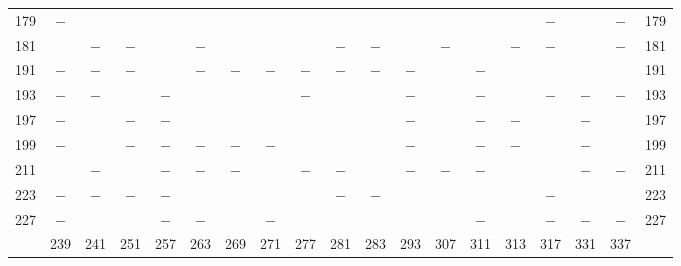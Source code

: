 \begin{center}
\begin{tabular}{r|c|c|c|c|c|c|c|c|c|c|c|c|c|c|c|c|c|r}
179 & $-$ &  &  &  &  &  &  &  &  &  &  &  &  &  & $-$ &  & $-$ & 179\\
181 &  & $-$ & $-$ &  & $-$ &  &  &  & $-$ & $-$ &  & $-$ &  & $-$ & $-$ &  & $-$ & 181\\
191 & $-$ & $-$ & $-$ &  & $-$ & $-$ & $-$ & $-$ & $-$ & $-$ & $-$ &  & $-$ &  &  &  &  & 191\\
193 & $-$ & $-$ &  & $-$ &  &  &  & $-$ &  &  & $-$ &  & $-$ &  & $-$ & $-$ & $-$ & 193\\
197 & $-$ &  & $-$ & $-$ &  &  &  &  &  &  & $-$ &  & $-$ & $-$ &  & $-$ &  & 197\\
199 & $-$ &  & $-$ & $-$ & $-$ & $-$ & $-$ &  &  &  & $-$ &  & $-$ & $-$ &  & $-$ &  & 199\\
211 &  & $-$ &  & $-$ & $-$ & $-$ &  & $-$ & $-$ &  & $-$ & $-$ & $-$ &  &  & $-$ & $-$ & 211\\
223 & $-$ & $-$ & $-$ & $-$ &  &  &  &  & $-$ & $-$ &  &  &  &  & $-$ &  &  & 223\\
227 & $-$ &  &  & $-$ & $-$ &  & $-$ &  &  &  &  &  & $-$ &  & $-$ & $-$ & $-$ & 227\\
\hline
 & 239 & 241 & 251 & 257 & 263 & 269 & 271 & 277 & 281 & 283 & 293 & 307 & 311 & 313 & 317 & 331 & 337 & \\
\hline
\end{tabular}\endgroup\end{center}

